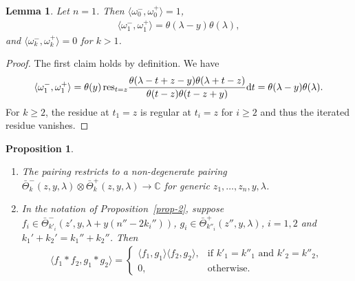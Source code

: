 \documentclass[pdftex]{sigma}
\numberwithin{equation}{section}
\newtheorem{Lemma}[Theorem]{Lemma}
\newtheorem{Proposition}[Theorem]{Proposition}
 { \theoremstyle{definition}
\newtheorem{Definition}[Theorem]{Definition}
\newtheorem{Example}[Theorem]{Example}
\newtheorem{Remark}[Theorem]{Remark} }
\begin{document}
\begin{Lemma}\label{lemma-3} Let $n=1$. Then $\langle \omega^-_0,\omega^+_0\rangle=1$,
 \begin{gather*}
 \langle \omega^-_1,\omega^+_1\rangle=\theta(\lambda-y) \theta(\lambda),
 \end{gather*}
 and $\langle\omega^-_k,\omega^+_k\rangle=0$ for $k>1$.
\end{Lemma}
\begin{proof} The first claim holds by definition. We have
 \begin{gather*}
 \langle\omega^-_1,\omega^+_1\rangle =\theta(y)\,\mathrm{res}_{t=z}\frac{\theta(\lambda-t+z-y) \theta(\lambda+t-z)}{\theta(t-z)\theta(t-z+y)}{\rm d}t =\theta(\lambda-y) \theta(\lambda).
 \end{gather*}
 For $k\geq 2$, the residue at $t_1=z$ is regular at $t_i=z$ for $i\geq2$ and thus the iterated residue vanishes.
\end{proof}
\begin{Proposition}\label{prop-4}\quad \begin{enumerate}\itemsep=0pt
 \item[$(i)$] The pairing restricts to a non-degenerate pairing $\bar\Theta^-_k(z,y,\lambda) \otimes\bar\Theta^+_k(z,y,\lambda) \to \mathbb C$ for generic $z_1,\dots,z_n,y,\lambda$.
 \item[$(ii)$] In the notation of Proposition~{\rm \ref{prop-2}}, suppose $f_i\!\in\! \bar\Theta^-_{k'_i}(z',y,\lambda+y(n''-2k_i''))$, $g_i\!\in\! \bar\Theta^+_{k''_i}(z'',y,\lambda)$, $i=1,2$ and $k_1'+k_2'=k_1''+k_2''$. Then
 \begin{gather*}
 \langle f_1*f_2,g_1*g_2\rangle= \begin{cases}\langle f_1,g_1\rangle\langle f_2,g_2\rangle, & \text{if $k'_1=k''_1$ and $k'_2=k''_2$}, \\
 0,&\text{otherwise}.
 \end{cases}
 \end{gather*}
 \end{enumerate}
\end{Proposition}
\end{document}

